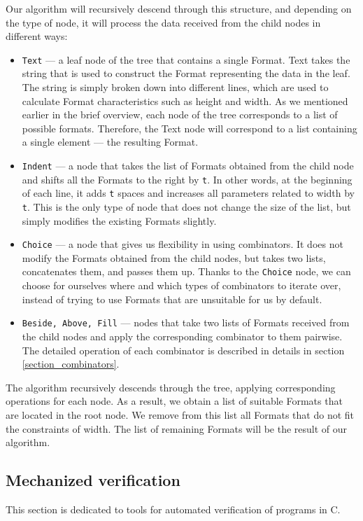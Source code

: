 \documentclass[14pt]{constructor-diploma}
\begin{document}
Our algorithm will recursively descend through this structure, 
and depending on the type of node, it will process the data received from the child nodes in different ways:
\begin{itemize}
  \item \texttt{Text} --- a leaf node of the tree that contains a single Format.
    Text takes the string that is used to construct the Format representing the data in the leaf.
    The string is simply broken down into different lines, which are used to calculate Format characteristics such as height and width.
    As we mentioned earlier in the brief overview, each node of the tree corresponds to a list of possible formats. 
    Therefore, the Text node will correspond to a list containing a single element --- the resulting Format.
  \item \texttt{Indent} --- a node that takes the list of Formats obtained from the child node 
    and shifts all the Formats to the right by \texttt{t}. In other words, 
    at the beginning of each line, it adds \texttt{t} spaces and increases all parameters related to width by \texttt{t}. 
    This is the only type of node that does not change the size of the list, but simply modifies the existing Formats slightly.
  \item \texttt{Choice} --- a node that gives us flexibility in using combinators. 
    It does not modify the Formats obtained from the child nodes, but takes two lists, 
    concatenates them, and passes them up. Thanks to the \texttt{Choice} node, 
    we can choose for ourselves where and which types of combinators to iterate over, 
    instead of trying to use Formats that are unsuitable for us by default.
  \item \texttt{Beside, Above, Fill} --- nodes that take two lists of Formats received from the child nodes 
    and apply the corresponding combinator to them pairwise. 
    The detailed operation of each combinator is described in details in section \ref{section_combinators}.
\end{itemize}

The algorithm recursively descends through the tree, applying corresponding operations for each node. 
As a result, we obtain a list of suitable Formats that are located in the root node. 
We remove from this list all Formats that do not fit the constraints of width.
The list of remaining Formats will be the result of our algorithm.
\subsection{Mechanized verification}
This section is dedicated to tools for automated verification of programs in C.
\end{document}
